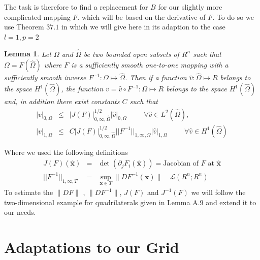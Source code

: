 \documentclass[times]{fldauth}
\newcommand{\mb}{\mathbf}
\newtheorem{lemma}{Lemma}[section]
\begin{document}
\nocite{ciarlet1972interpolation}
The task is therefore to find a replacement for $B$ for our slightly more complicated mapping $F$.
which will be based on the derivative of $F$.
To do so we use  Theorem $37.1$ in \cite{ciarlet1994handbook} which we will give here in its adaption to the case
$l=1,p=2$
\\
\begin{lemma}
\label{lemma:Bil}
Let $\Omega$ and $\hat{\Omega}$ be two bounded open subsets of $R^n$ such that $\Omega=F(\hat{\Omega})$ where $F$ is a
sufficiently smooth one-to-one mapping with a sufficiently smooth inverse $F^{-1}: \Omega \mapsto \hat{\Omega}$.
Then if a function $\hat{v}:\hat{\Omega}\mapsto R $ belongs to the space $H^1(\hat{\Omega})$, the function $v=\hat{v} \circ F^{-1}:{\Omega}\mapsto R$ 
belongs to the space  $H^1(\hat{\Omega})$ and, in addition there exist constants $C$ such that
\begin{eqnarray}
|v|_{0,\Omega} &\le& |J(F)|_{0,\infty,\hat{\Omega}}^{1/2}|\hat{v}|_{0,\Omega} 						\hspace{1cm} \forall \hat{v} \in L^2(\hat{\Omega}),\\
|v|_{1,\Omega} &\le& C|J(F)|_{0,\infty,\hat{\Omega}}^{1/2} || F ^{-1}||_{1,\infty,\Omega} |\hat{v}|_{1,\Omega}  \hspace{1cm} \forall \hat{v} \in H^1(\hat{\Omega})
\end{eqnarray}
\end{lemma}
Where we used the following definitions
\begin{eqnarray}
J(F)(\hat{\mb x})					&=&	\det(\partial_j F_i(\hat{\mb x}))	=	\text{Jacobian of $F$ at $\hat{\mb x}$} \\
||F^{-1}||_{1,\infty,T}				&=&	\sup_{\mb x \in T} \|D F^{-1}(\mb x)\| \quad \mathcal{L}(R^n;R^n)
\end{eqnarray}
To estimate the $\| DF  \|$ , $\| DF^{-1}  \|$, $J(F)$ and  $J^{-1}(F)$ we will follow the two-dimensional example for quadrilaterals given in Lemma A.9  \cite[p.~107]{GiraultRaviart}	and extend it to our needs.
\section{Adaptations to our Grid}
\label{sec:proof}
\end{document}

